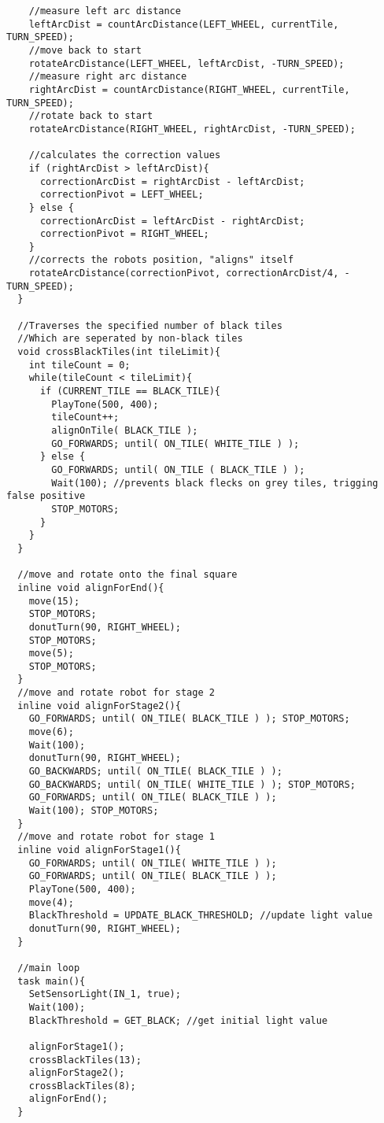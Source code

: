 \documentclass[a4paper,11pt]{article}
\begin{document}
\begin{lstlisting}
    //measure left arc distance
    leftArcDist = countArcDistance(LEFT_WHEEL, currentTile, TURN_SPEED);
    //move back to start
    rotateArcDistance(LEFT_WHEEL, leftArcDist, -TURN_SPEED);
    //measure right arc distance
    rightArcDist = countArcDistance(RIGHT_WHEEL, currentTile, TURN_SPEED);
    //rotate back to start
    rotateArcDistance(RIGHT_WHEEL, rightArcDist, -TURN_SPEED);

    //calculates the correction values
    if (rightArcDist > leftArcDist){
      correctionArcDist = rightArcDist - leftArcDist;
      correctionPivot = LEFT_WHEEL;
    } else {
      correctionArcDist = leftArcDist - rightArcDist;
      correctionPivot = RIGHT_WHEEL;
    }
    //corrects the robots position, "aligns" itself
    rotateArcDistance(correctionPivot, correctionArcDist/4, -TURN_SPEED);
  }

  //Traverses the specified number of black tiles
  //Which are seperated by non-black tiles
  void crossBlackTiles(int tileLimit){
    int tileCount = 0;
    while(tileCount < tileLimit){
      if (CURRENT_TILE == BLACK_TILE){
        PlayTone(500, 400);
        tileCount++;
        alignOnTile( BLACK_TILE );
        GO_FORWARDS; until( ON_TILE( WHITE_TILE ) );
      } else {
        GO_FORWARDS; until( ON_TILE ( BLACK_TILE ) );
        Wait(100); //prevents black flecks on grey tiles, trigging false positive
        STOP_MOTORS;
      }
    }
  }

  //move and rotate onto the final square
  inline void alignForEnd(){
    move(15);
    STOP_MOTORS;
    donutTurn(90, RIGHT_WHEEL);
    STOP_MOTORS;
    move(5);
    STOP_MOTORS;
  }
  //move and rotate robot for stage 2
  inline void alignForStage2(){
    GO_FORWARDS; until( ON_TILE( BLACK_TILE ) ); STOP_MOTORS;
    move(6);
    Wait(100);
    donutTurn(90, RIGHT_WHEEL);
    GO_BACKWARDS; until( ON_TILE( BLACK_TILE ) );
    GO_BACKWARDS; until( ON_TILE( WHITE_TILE ) ); STOP_MOTORS;
    GO_FORWARDS; until( ON_TILE( BLACK_TILE ) );
    Wait(100); STOP_MOTORS;
  }
  //move and rotate robot for stage 1
  inline void alignForStage1(){
    GO_FORWARDS; until( ON_TILE( WHITE_TILE ) );
    GO_FORWARDS; until( ON_TILE( BLACK_TILE ) );
    PlayTone(500, 400);
    move(4);
    BlackThreshold = UPDATE_BLACK_THRESHOLD; //update light value
    donutTurn(90, RIGHT_WHEEL);
  }

  //main loop
  task main(){
    SetSensorLight(IN_1, true);
    Wait(100);
    BlackThreshold = GET_BLACK; //get initial light value

    alignForStage1();
    crossBlackTiles(13);
    alignForStage2();
    crossBlackTiles(8);
    alignForEnd();
  }
\end{lstlisting}
\end{document}
